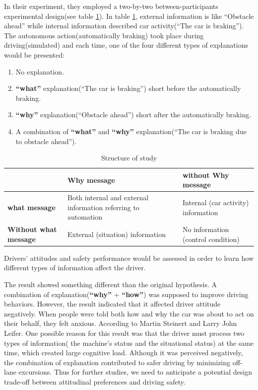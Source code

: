     \indent In their experiment, they employed a two-by-two between-participants experimental design(see table \ref{table:2}).
    In table \ref{table:2}, external information is like ``Obstacle ahead'' while internal information described car activity(``The car is braking'').
    The autonomous action(automatically braking) took place during driving(simulated) and each time, one of the four different types of explanations would be presented:
    \begin{enumerate}
        \item No explanation.
        \item \textbf{``what''} explanation(``The car is braking'') short before the automatically braking.
        \item \textbf{``why''} explanation(``Obstacle ahead'') short after the automatically braking.
        \item A combination of \textbf{``what''} and \textbf{``why''} explanation(``The car is braking due to obstacle ahead'').
    \end{enumerate}
    \begin{table}[ht] 
        \centering
        \begin{tabular}{ | m{2cm} | m{6em} | m{2cm} | }
        \hline
            & \bfseries Why message & \bfseries without Why message\\ [0.5ex] 
        \hline
        \bfseries what message & Both internal and external information referring to automation & Internal (car activity) information\\ 
        \hline
        \bfseries Without what message & External (situation) information & No information (control condition)\\ 
        \hline
        \end{tabular}
        \caption{Structure of study\cite{koo2015did}}
        \label{table:2}
    \end{table}

    \indent Drivers' attitudes and safety performance would be assessed 
    in order to learn how different types of information affect the driver. 
    
    \indent The result showed something different than the original hypothesis.
    A combination of explanation(\textbf{``why''} + \textbf{``how''}) was supposed to 
    improve driving behaviors. However, the result indicated that it affected driver attitude negatively.
    When people were told both how and why the car was about to act on their behalf, they felt anxious.
    According to Martin Steinert and Larry John Leifer. One possible reason for this result
    was that the driver must process two types of information( the machine’s status and the situational status) at the same time,
    which created large cognitive load. Although it was perceived negatively, the combination of explanation
    contributed to safer driving by minimizing off-lane excursions. Thus for further studies, we need to anticipate
    a potential design trade-off between attitudinal preferences and driving safety.

